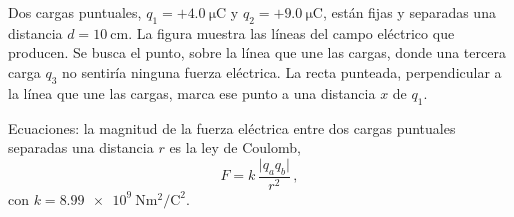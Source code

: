 \documentclass[12pt, a4paper]{article}
\begin{document}
\begin{exercise}[ID=coulomb-nulo, subtitle={Punto de fuerza nula}, tags={parcial3}, points=25, nuevapagina=true]
Dos cargas puntuales, $q_1 = +\qty{4.0}{\micro\coulomb}$ y $q_2 = +\qty{9.0}{\micro\coulomb}$, están fijas y separadas una distancia $d = \qty{10}{\centi\meter}$. La figura muestra las líneas del campo eléctrico que producen. Se busca el punto, sobre la línea que une las cargas, donde una tercera carga $q_3$ no sentiría ninguna fuerza eléctrica. La recta punteada, perpendicular a la línea que une las cargas, marca ese punto a una distancia $x$ de $q_1$.

Ecuaciones: la magnitud de la fuerza eléctrica entre dos cargas puntuales separadas una distancia $r$ es la ley de Coulomb,
\begin{equation}
    F = k\,\frac{\lvert q_a q_b\rvert}{r^2}\,,
\end{equation}
con $k = \qty{8.99e9}{\newton\meter\squared\per\coulomb\squared}$.


\end{exercise}
\end{document}

